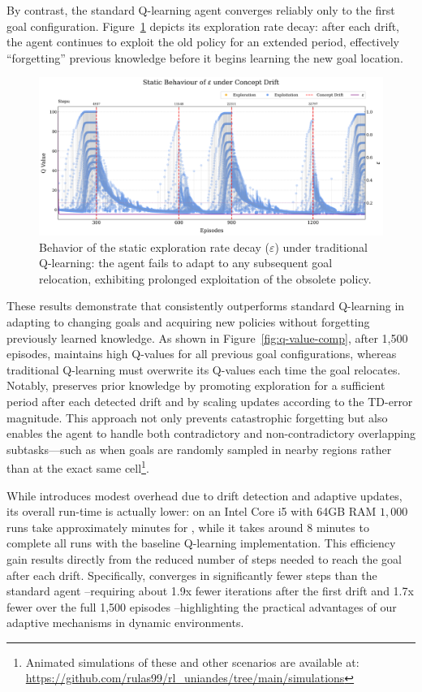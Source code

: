 By contrast, the standard Q-learning agent converges reliably only to the first goal configuration. Figure~\ref{fig:static-eps} depicts its exploration rate decay: after each drift, the agent continues to exploit the old policy for an extended period, effectively “forgetting” previous knowledge before it begins learning the new goal location.

\begin{figure}
    \centering
    \includegraphics[width=\textwidth]{figures/trad_eps.png}
    \caption{Behavior of the static exploration rate decay ($\varepsilon$) under traditional Q-learning: the agent fails to adapt to any subsequent goal relocation, exhibiting prolonged exploitation of the obsolete policy.}
    \label{fig:static-eps}
\end{figure}


These results demonstrate that \adaptiverl consistently outperforms standard Q-learning in adapting to changing goals and acquiring new policies without forgetting previously learned knowledge. As shown in Figure~\ref{fig:q-value-comp}, after 1,500 episodes, \adaptiverl maintains high Q-values for all previous goal configurations, whereas traditional Q-learning must overwrite its Q-values each time the goal relocates. Notably, \adaptiverl preserves prior knowledge by promoting exploration for a sufficient period after each detected drift and by scaling updates according to the TD-error magnitude. This approach not only prevents catastrophic forgetting but also enables the agent to handle both contradictory and non-contradictory overlapping subtasks—such as when goals are randomly sampled in nearby regions rather than at the exact same cell\footnote{Animated simulations of these and other scenarios are available at: \url{https://github.com/rulas99/rl_uniandes/tree/main/simulations}}.

While \adaptiverl introduces modest overhead due to drift detection and adaptive updates, its overall 
run-time is actually lower: on an Intel Core i5 with 64GB RAM $1,000$ runs take approximately
minutes for \adaptiverl, while it takes around 8 minutes to complete all runs with the baseline Q-learning implementation. This efficiency gain results directly from the reduced number of steps needed to reach the goal after each drift. Specifically, \adaptiverl converges in significantly fewer steps than the standard agent --requiring about 1.9x fewer iterations after the first drift and 1.7x fewer over the full 1,500 episodes --highlighting the practical advantages of our adaptive mechanisms in dynamic environments.

